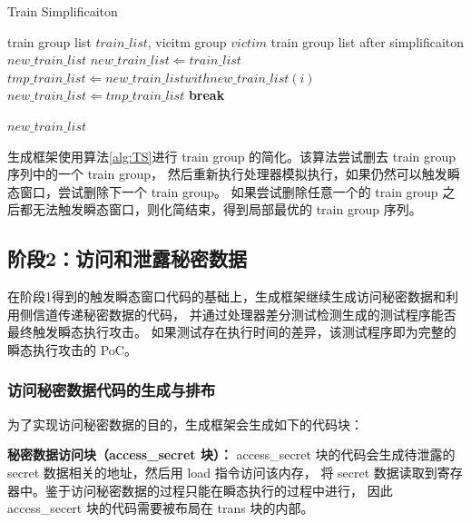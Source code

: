 \begin{algorithm}[!h]
    
    
    \caption{Train Simplificaiton}
    \label{alg:TS}
    \renewcommand{\algorithmicrequire}{\textbf{Input:}}
    \renewcommand{\algorithmicensure}{\textbf{Output:}}
    
    \begin{algorithmic}[1]
        \REQUIRE train group list $train\_list$, vicitm group $victim$  %
        \ENSURE train group list after simplificaiton $new\_train\_list$    %
        \STATE $new\_train\_list \Leftarrow train\_list$
                \STATE $tmp\_train\_list \Leftarrow new\_train\_list with new\_train\_list(i)$
                    \STATE $new\_train\_list \Leftarrow tmp\_train\_list$
                    \STATE \textbf{break}
                \ENDIF
            \ENDFOR
        \ENDFOR

        \RETURN $new\_train\_list$
    \end{algorithmic}
\end{algorithm}

生成框架使用算法\ref{alg:TS}进行 train group 的简化。该算法尝试删去 train group 序列中的一个 train group，
然后重新执行处理器模拟执行，如果仍然可以触发瞬态窗口，尝试删除下一个 train group。
如果尝试删除任意一个的 train group 之后都无法触发瞬态窗口，则化简结束，得到局部最优的 train group 序列。\par

\subsection{阶段2：访问和泄露秘密数据}

在阶段1得到的触发瞬态窗口代码的基础上，生成框架继续生成访问秘密数据和利用侧信道传递秘密数据的代码，
并通过处理器差分测试检测生成的测试程序能否最终触发瞬态执行攻击。
如果测试存在执行时间的差异，该测试程序即为完整的瞬态执行攻击的 PoC。

\subsubsection{访问秘密数据代码的生成与排布}

为了实现访问秘密数据的目的，生成框架会生成如下的代码块：\par

\textbf{秘密数据访问块（access\_secret 块）：}
access\_secret 块的代码会生成待泄露的 secret 数据相关的地址，然后用 load 指令访问该内存，
将 secret 数据读取到寄存器中。鉴于访问秘密数据的过程只能在瞬态执行的过程中进行，
因此 access\_secert 块的代码需要被布局在 trans 块的内部。\par


